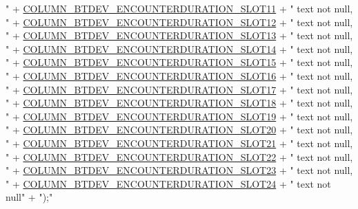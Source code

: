 \begin{DoxyCode}
{       "}
            + \hyperlink{classcs_1_1nsense_1_1db_1_1_n_sense_s_q_lite_helper_a2a7d11fcb1f954f0cda9b0b5488d7f72}{COLUMN\_BTDEV\_ENCOUNTERDURATION\_SLOT11} + \textcolor{stringliteral}{" text not null,
       "}
            + \hyperlink{classcs_1_1nsense_1_1db_1_1_n_sense_s_q_lite_helper_a97ea5d9c1ef3e460d54e87a12b1475fe}{COLUMN\_BTDEV\_ENCOUNTERDURATION\_SLOT12} + \textcolor{stringliteral}{" text not null,
       "}
            + \hyperlink{classcs_1_1nsense_1_1db_1_1_n_sense_s_q_lite_helper_a91ca35edc69c8784edc52e460e404538}{COLUMN\_BTDEV\_ENCOUNTERDURATION\_SLOT13} + \textcolor{stringliteral}{" text not null,
       "}
            + \hyperlink{classcs_1_1nsense_1_1db_1_1_n_sense_s_q_lite_helper_a31c1166964baa1fdf97a97a9f72ac07e}{COLUMN\_BTDEV\_ENCOUNTERDURATION\_SLOT14} + \textcolor{stringliteral}{" text not null,
       "}
            + \hyperlink{classcs_1_1nsense_1_1db_1_1_n_sense_s_q_lite_helper_abeaba69baab42467bc450b18a4b3e26c}{COLUMN\_BTDEV\_ENCOUNTERDURATION\_SLOT15} + \textcolor{stringliteral}{" text not null,
       "}
            + \hyperlink{classcs_1_1nsense_1_1db_1_1_n_sense_s_q_lite_helper_aa8de31531131eda77bf5db18f65c9e7b}{COLUMN\_BTDEV\_ENCOUNTERDURATION\_SLOT16} + \textcolor{stringliteral}{" text not null,
       "}
            + \hyperlink{classcs_1_1nsense_1_1db_1_1_n_sense_s_q_lite_helper_ac55647f62ad55ab96661fabe27156787}{COLUMN\_BTDEV\_ENCOUNTERDURATION\_SLOT17} + \textcolor{stringliteral}{" text not null,
       "}
            + \hyperlink{classcs_1_1nsense_1_1db_1_1_n_sense_s_q_lite_helper_af0b40f941b35daa7a86daf53697994db}{COLUMN\_BTDEV\_ENCOUNTERDURATION\_SLOT18} + \textcolor{stringliteral}{" text not null,
       "}
            + \hyperlink{classcs_1_1nsense_1_1db_1_1_n_sense_s_q_lite_helper_a3af10883de8b80b461d36dae12812b70}{COLUMN\_BTDEV\_ENCOUNTERDURATION\_SLOT19} + \textcolor{stringliteral}{" text not null,
       "}
            + \hyperlink{classcs_1_1nsense_1_1db_1_1_n_sense_s_q_lite_helper_af0783690cdda0a868a44c913c2bc4ccd}{COLUMN\_BTDEV\_ENCOUNTERDURATION\_SLOT20} + \textcolor{stringliteral}{" text not null,
       "}
            + \hyperlink{classcs_1_1nsense_1_1db_1_1_n_sense_s_q_lite_helper_aeeb83cf96db1205867782917cb28fae3}{COLUMN\_BTDEV\_ENCOUNTERDURATION\_SLOT21} + \textcolor{stringliteral}{" text not null,
       "}
            + \hyperlink{classcs_1_1nsense_1_1db_1_1_n_sense_s_q_lite_helper_a0465b5a08fa1199b51f892c714de80a8}{COLUMN\_BTDEV\_ENCOUNTERDURATION\_SLOT22} + \textcolor{stringliteral}{" text not null,
       "}
            + \hyperlink{classcs_1_1nsense_1_1db_1_1_n_sense_s_q_lite_helper_aa19cb38e6c45606cd6e7a28c8938c7d6}{COLUMN\_BTDEV\_ENCOUNTERDURATION\_SLOT23} + \textcolor{stringliteral}{" text not null,
       "}
            + \hyperlink{classcs_1_1nsense_1_1db_1_1_n_sense_s_q_lite_helper_a42c8ca8db6aa3f3d7b59f188a4387d9c}{COLUMN\_BTDEV\_ENCOUNTERDURATION\_SLOT24} + \textcolor{stringliteral}{" text not null"}
            + \textcolor{stringliteral}{");"}
\end{DoxyCode}
